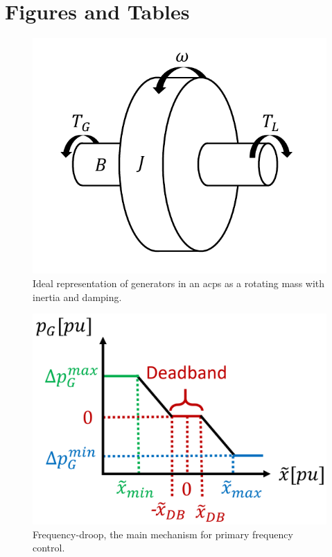 \documentclass[utf8]{frontiersSCNS} %
\begin{document}



\section*{Figures and Tables}


\begin{figure}[ht!]
	\centering
	\includegraphics[width=0.4\linewidth]{fig/rotmass.pdf}
	\caption[]{Ideal representation of generators in an \gls{acps} as a rotating mass with inertia and damping.}
	\label{fig:rotmass}
\end{figure}

\begin{figure}[ht!]
	\centering
	\includegraphics[width=0.4\linewidth]{fig/freqdroop.png}
	\caption[]{Frequency-droop, the main mechanism for primary frequency control.}
	\label{fig:freqdroop}
\end{figure}
\end{document}
